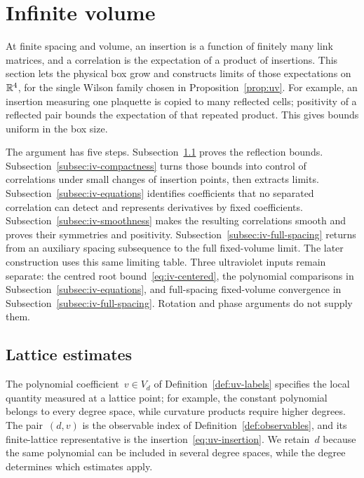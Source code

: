 \section{Infinite volume}\label{sec:infinite-volume}

At finite spacing and volume, an insertion is a function of finitely many link matrices, and a correlation is the expectation of a product of insertions. This section lets the physical box grow and constructs limits of those expectations on~$\mathbb R^4$, for the single Wilson family chosen in Proposition~\ref{prop:uv}. For example, an insertion measuring one plaquette is copied to many reflected cells; positivity of a reflected pair bounds the expectation of that repeated product. This gives bounds uniform in the box size.

The argument has five steps. Subsection~\ref{subsec:iv-lattice} proves the reflection bounds. Subsection~\ref{subsec:iv-compactness} turns those bounds into control of correlations under small changes of insertion points, then extracts limits. Subsection~\ref{subsec:iv-equations} identifies coefficients that no separated correlation can detect and represents derivatives by fixed coefficients. Subsection~\ref{subsec:iv-smoothness} makes the resulting correlations smooth and proves their symmetries and positivity. Subsection~\ref{subsec:iv-full-spacing} returns from an auxiliary spacing subsequence to the full fixed-volume limit. The later construction uses this same limiting table. Three ultraviolet inputs remain separate: the centred root bound~\eqref{eq:iv-centered}, the polynomial comparisons in Subsection~\ref{subsec:iv-equations}, and full-spacing fixed-volume convergence in Subsection~\ref{subsec:iv-full-spacing}. Rotation and phase arguments do not supply them.

\subsection{Lattice estimates}\label{subsec:iv-lattice}

The polynomial coefficient~$v\in V_d$ of Definition~\ref{def:uv-labels} specifies the local quantity measured at a lattice point; for example, the constant polynomial belongs to every degree space, while curvature products require higher degrees. The pair~$(d,v)$ is the observable index of Definition~\ref{def:observables}, and its finite-lattice representative is the insertion~\eqref{eq:uv-insertion}. We retain~$d$ because the same polynomial can be included in several degree spaces, while the degree determines which estimates apply.

